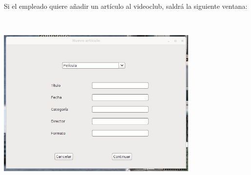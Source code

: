 Si el empleado quiere añadir un artículo al videoclub, saldrá la siguiente ventana:\\
\includegraphics[width=10cm, height=10cm, keepaspectratio]{img/nuevoarticulo.jpg}\\
\clearpage

	
